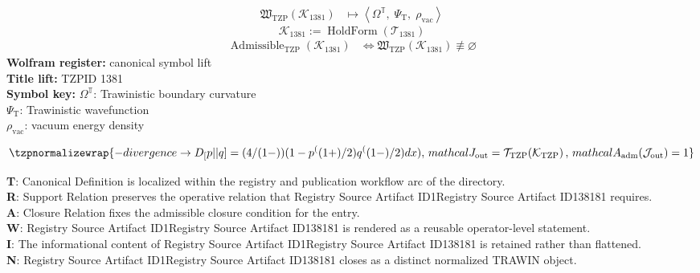 \noindent
\begin{minipage}[t]{0.48\linewidth}
\begingroup
\small
\[
\begin{aligned}
\mathfrak{W}_{\mathrm{TZP}}\!\left(\mathcal{K}_{1381}\right)
&\longmapsto
\left\langle \Omega^{\mathbb{T}},\; \Psi_{\mathrm{T}},\; \rho_{\mathrm{vac}} \right\rangle
\end{aligned}
\]
\[
\mathcal{K}_{1381}
:=
\operatorname{HoldForm}\!\left(\mathcal{T}_{1381}\right)
\]
\[
\begin{aligned}
\operatorname{Admissible}_{\mathrm{TZP}}\!\left(\mathcal{K}_{1381}\right)
&\Longleftrightarrow
\mathfrak{W}_{\mathrm{TZP}}\!\left(\mathcal{K}_{1381}\right)\not\equiv\varnothing
\end{aligned}
\]
\textbf{Wolfram register:} canonical symbol lift\\
\textbf{Title lift:} TZPID 1381\\
\textbf{Symbol key:} \(\Omega^{\mathbb{T}}\): Trawinistic boundary curvature\\ \(\Psi_{\mathrm{T}}\): Trawinistic wavefunction\\ \(\rho_{\mathrm{vac}}\): vacuum energy density
\par
\endgroup
\end{minipage}\hfill
\begin{minipage}[t]{0.48\linewidth}
\[
\tzpnormalizewrap{-divergence \to D_[p||q] = (4/(1-))(1 - p^((1+)/2) q^((1-)/2) dx),\,mathcal{J}_{\mathrm{out}} = \mathcal{T}_{\mathrm{TZP}}\!\left(\mathcal{K}_{\mathrm{TZP}}\right),\,mathcal{A}_{\mathrm{adm}}\!\left(\mathcal{J}_{\mathrm{out}}\right)=1}
\]

\small
\textbf{T}: Canonical Definition is localized within the registry and publication workflow arc of the directory.\\
\textbf{R}: Support Relation preserves the operative relation that Registry Source Artifact ID1Registry Source Artifact ID138181 requires.\\
\textbf{A}: Closure Relation fixes the admissible closure condition for the entry.\\
\textbf{W}: Registry Source Artifact ID1Registry Source Artifact ID138181 is rendered as a reusable operator-level statement.\\
\textbf{I}: The informational content of Registry Source Artifact ID1Registry Source Artifact ID138181 is retained rather than flattened.\\
\textbf{N}: Registry Source Artifact ID1Registry Source Artifact ID138181 closes as a distinct normalized TRAWIN object.
\normalsize
\end{minipage}

